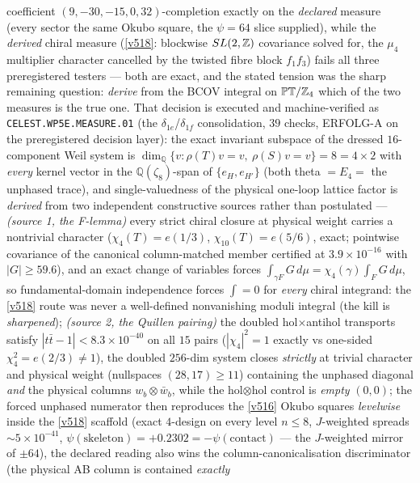 coefficient $(9,-30,-15,0,32)$-completion exactly on the \emph{declared} measure (every sector
the same Okubo square, the $\psi=64$ slice supplied), while the \emph{derived} chiral measure
(\vref{v518}: blockwise $SL(2,\mathbb Z)$ covariance solved for, the $\mu_4$ multiplier character
cancelled by the twisted fibre block $f_1f_3$) fails all three preregistered testers --- both
are exact, and the stated tension was the sharp remaining question: \emph{derive} from the BCOV
integral on $\mathbb{PT}/\mathbb Z_4$ which of the two measures is the true one. That decision is
executed and machine-verified as \texttt{CELEST.WP5E.MEASURE.01}
 (the $\delta_{1e}$/$\delta_{1f}$
consolidation, $39$ checks, ERFOLG-A on the preregistered decision layer): the exact invariant
subspace of the dressed $16$-component Weil system is
$\dim_{\mathbb Q}\{v:\rho(T)v=v,\ \rho(S)v=v\}=8=4\times2$ with \emph{every} kernel vector in
the $\mathbb Q(\zeta_8)$-span of $\{e_H,e_{H'}\}$ (both theta $=E_4=$ the unphased trace), and
single-valuedness of the physical one-loop lattice factor is \emph{derived} from two
independent constructive sources rather than postulated --- \emph{(source 1, the F-lemma)}
every strict chiral closure at physical weight carries a nontrivial character
($\chi_4(T)=e(1/3)$, $\chi_{10}(T)=e(5/6)$, exact; pointwise covariance of the canonical
column-matched member certified at $3.9\times10^{-16}$ with $|G|\ge59.6$), and an exact change
of variables forces $\int_{\gamma F}G\,d\mu=\chi_4(\gamma)\int_FG\,d\mu$, so
fundamental-domain independence forces $\int=0$ for \emph{every} chiral integrand: the
\vref{v518} route was never a well-defined nonvanishing moduli integral (the kill is
\emph{sharpened}); \emph{(source 2, the Quillen pairing)} the doubled hol$\times$antihol
transports satisfy $|t\bar t-1|<8.3\times10^{-40}$ on all $15$ pairs ($|\chi_4|^2=1$ exactly vs
one-sided $\chi_4^2=e(2/3)\neq1$), the doubled $256$-dim system closes \emph{strictly} at
trivial character and physical weight (nullspaces $(28,17)\ge11$) containing the unphased
diagonal \emph{and} the physical columns $w_b\otimes\bar w_b$, while the hol$\otimes$hol control
is \emph{empty} $(0,0)$; the forced unphased numerator then reproduces the \vref{v516} Okubo
squares \emph{levelwise} inside the \vref{v518} scaffold (exact $4$-design on every level
$n\le8$, $J$-weighted spreads $\sim5\times10^{-41}$, $\psi(\text{skeleton})=+0.2302=
-\psi(\text{contact})$ --- the $J$-weighted mirror of $\pm64$), the declared reading also wins
the column-canonicalisation discriminator (the physical AB column is contained \emph{exactly}

